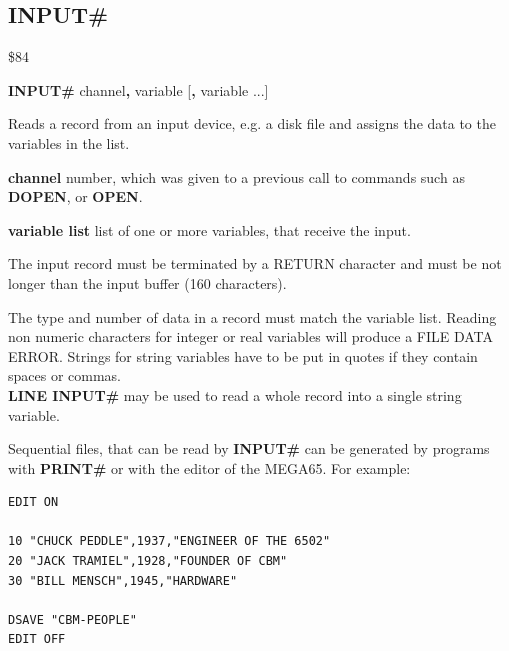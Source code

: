 
\newpage
\subsection{INPUT\#}
\begin{description}[leftmargin=2cm,style=nextline]
\item [Token:] \$84
\item [Format:] {\bf INPUT\#} channel{\bf,} variable [{\bf,} variable ...]
\item [Usage:] Reads a record
               from an input device, e.g. a disk file
               and assigns the data
               to the variables in the list.

               {\bf channel} number, which was given to a previous
               call to commands such as {\bf DOPEN}, or {\bf OPEN}.


               {\bf variable list} list of one or more
               variables, that receive the input.

               The input record must be terminated by a
               RETURN character and must be not longer than
               the input buffer (160 characters).

\item [Remarks:] The type and number of data in a record must
               match the variable list.
               Reading non numeric characters for integer or real
               variables will produce a FILE DATA ERROR.
               Strings for string variables have to be put in quotes
               if they contain spaces or commas. \\
               {\bf LINE INPUT\#} may be used to
               read a whole record into a single string variable.

               Sequential files, that can be read by {\bf INPUT\#}
               can be generated by programs with {\bf PRINT\#}
               or with the editor of the MEGA65.
               For example:

\begin{tcolorbox}[colback=black,coltext=white]
\verbatimfont{\codefont}
\begin{verbatim}
EDIT ON

10 "CHUCK PEDDLE",1937,"ENGINEER OF THE 6502"
20 "JACK TRAMIEL",1928,"FOUNDER OF CBM"
30 "BILL MENSCH",1945,"HARDWARE"

DSAVE "CBM-PEOPLE"
EDIT OFF
\end{verbatim}
\end{tcolorbox}


\end{description}
